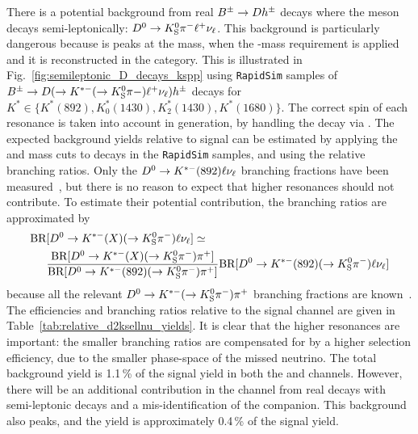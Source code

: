 There is a potential background from real ${{B}^\pm}\rightarrow{\ensuremath{D}} h^\pm$ decays where the \D meson decays semi-leptonically: ${{D}^0}\rightarrow{\ensuremath{{K}^0_{\mathrm{S}}}}{\ensuremath{{\pi}^-}}\ell^+\nu_\ell$. This background is particularly dangerous because is peaks at the \B mass, when the \D-mass requirement is applied and it is reconstructed in the \DtoKspipi category. This is illustrated in Fig.~\ref{fig:semileptonic_D_decays_kspp} using \texttt{RapidSim} samples of ${{B}^\pm}\rightarrow{\ensuremath{D}}(\rightarrow K^{*-}(\rightarrow {\ensuremath{{K}^0_{\mathrm{S}}}}\pi-)\ell^+\nu_\ell)h^\pm $ decays for $K^{*}\in\{K^*(892), K^*_0(1430), K^*_2(1430), K^*(1680)\}$. The correct spin of each resonance is taken into account in generation, by handling the decay via \evtgen. The expected background yields relative to signal can be estimated by applying the \B and \D mass cuts to decays in the \texttt{RapidSim} samples, and using the relative branching ratios. Only the ${{D}^0}\rightarrow{\ensuremath{{K}^{*-}}}(892)\ell\nu_\ell$ branching fractions have been measured~\cite{PDG2020}, but there is no reason to expect that higher \Kstar resonances should not contribute. To estimate their potential contribution, the branching ratios are approximated by
\begin{align*}
    \text{BR}&[{{D}^0}\rightarrow{\ensuremath{{K}^{*-}}}(X)(\rightarrow{\ensuremath{{K}^0_{\mathrm{S}}}}{\ensuremath{{\pi}^-}})\ell\nu_\ell] \simeq\\& \frac{\text{BR}[{{D}^0}\rightarrow{\ensuremath{{K}^{*-}}}(X)(\rightarrow{\ensuremath{{K}^0_{\mathrm{S}}}}{\ensuremath{{\pi}^-}}){{\pi}^+}] }{\text{BR}[{{D}^0}\rightarrow{\ensuremath{{K}^{*-}}}(892)(\rightarrow{\ensuremath{{K}^0_{\mathrm{S}}}}{\ensuremath{{\pi}^-}}){{\pi}^+}] }\text{BR}[{{D}^0}\rightarrow{\ensuremath{{K}^{*-}}}(892)(\rightarrow{\ensuremath{{K}^0_{\mathrm{S}}}}{\ensuremath{{\pi}^-}})\ell\nu_\ell] 
\end{align*}
because all the relevant ${{D}^0}\rightarrow{\ensuremath{{K}^{*-}}}(\rightarrow{\ensuremath{{K}^0_{\mathrm{S}}}}{\ensuremath{{\pi}^-}}){{\pi}^+}$ branching fractions are known~\cite{PDG2020
}. The efficiencies and branching ratios relative to the signal channel are given in Table~\ref{tab:relative_d2ksellnu_yields}. It is clear that the higher \Kstar resonances are important: the smaller branching ratios are compensated for by a higher selection efficiency, due to the smaller phase-space of the missed neutrino. The total background yield is 1.1\,\% of the signal yield in both the \BtoDpi and \BtoDK channels. However, there will be an additional contribution in the \BtoDK channel from real \BtoDpi decays with semi-leptonic \D decays and a mis-identification of the companion. This background also peaks, and the yield is approximately 0.4\,\% of the \BtoDK signal yield.



